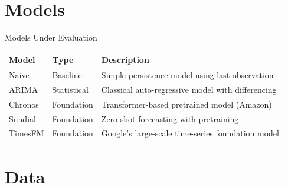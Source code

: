 \documentclass[aspectratio=169]{beamer}
\begin{document}

\section{Models}

\begin{frame}{Models Under Evaluation}
\begin{table}[]
\small
\begin{tabular}{@{}lll@{}}
\toprule
\textbf{Model} & \textbf{Type} & \textbf{Description} \\ \midrule
Naive & Baseline & Simple persistence model using last observation \\
ARIMA & Statistical & Classical auto-regressive model with differencing \\
Chronos & Foundation & Transformer-based pretrained model (Amazon) \\
Sundial & Foundation & Zero-shot forecasting with pretraining \\
TimesFM & Foundation & Google's large-scale time-series foundation model \\ \bottomrule
\end{tabular}
\end{table}
\end{frame}

\section{Data}
\end{document}

